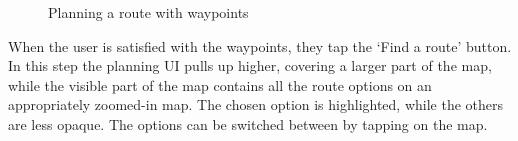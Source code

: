 \begin{figure}[h!]
    \centering
    \hfill
    \hfill
    \caption{Planning a route with waypoints}
    \label{fig:plan-waypoints}
\end{figure}

When the user is satisfied with the waypoints, they tap the `Find a route' button.
In this step the planning UI pulls up higher, covering a larger part of the map, while the visible part of the map contains all the route options on an appropriately zoomed-in map.
The chosen option is highlighted, while the others are less opaque.
The options can be switched between by tapping on the map.

